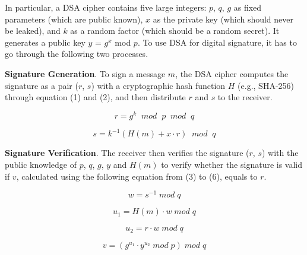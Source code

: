 In particular, a \textsf{\small DSA} cipher contains five large integers:  $p$, $q$, $g$ as fixed parameters (which are public known), 
	$x$ as the private key (which should never be leaked), and $k$ as a random factor (which should be a random secret). 
It generates a public key $y$ = $g^x$ mod $p$. To use \textsf{\small DSA} for digital signature, it has to go through the following two processes.

\begin{compactitem}
\item \textbf{Signature Generation}. To sign a message $m$, the \textsf{\small DSA} cipher computes the signature as a pair ($r$, $s$) with a cryptographic hash function $H$ (e.g., SHA-256) through equation (1) and (2), and then distribute $r$ and $s$ to the receiver.

\begin{equation}
r = g^k \;\; mod \;\; p \;\; mod \;\; q  
\end{equation}

\begin{equation}
s = k^{-1} (H(m) + x \cdot r) \;\; mod \;\; q
\end{equation}

\item \textbf{Signature Verification}.
The receiver then verifies the signature ($r$, $s$) with the public knowledge of $p$, $q$, $g$, $y$ and $H(m)$ to verify whether the signature is valid if $v$, calculated using the following equation from (3) to (6), equals to $r$.

\begin{equation}
w = s^{-1} \; mod \; q
\end{equation}

\begin{equation}
u_1 = H(m) \cdot w \; mod \; q
\end{equation}

\begin{equation}
u_2 = r \cdot w \; mod \; q
\end{equation}

\begin{equation}
v = (g^{u_1} \cdot y^{u_2} \; mod \; p ) \; mod \; q
\end{equation}
\end{compactitem}

